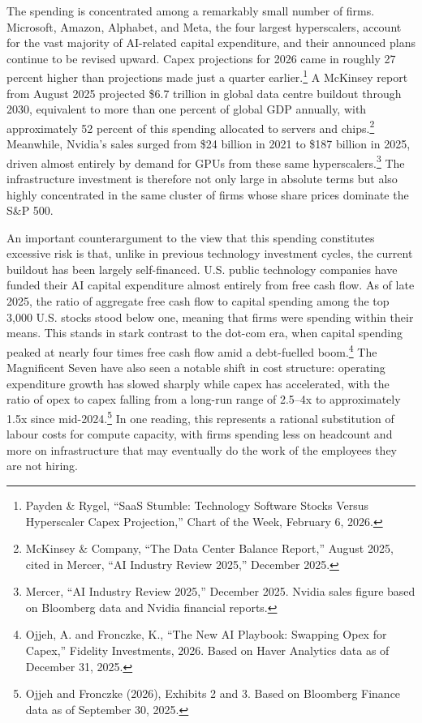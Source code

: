 \documentclass[12pt,a4paper]{article}
\begin{document}
The spending is concentrated among a remarkably small number of firms. Microsoft, Amazon, Alphabet, and Meta, the four largest hyperscalers, account for the vast majority of AI-related capital expenditure, and their announced plans continue to be revised upward. Capex projections for 2026 came in roughly 27 percent higher than projections made just a quarter earlier.\footnote{Payden \& Rygel, ``SaaS Stumble: Technology Software Stocks Versus Hyperscaler Capex Projection,'' Chart of the Week, February 6, 2026.} A McKinsey report from August 2025 projected \$6.7 trillion in global data centre buildout through 2030, equivalent to more than one percent of global GDP annually, with approximately 52 percent of this spending allocated to servers and chips.\footnote{McKinsey \& Company, ``The Data Center Balance Report,'' August 2025, cited in Mercer, ``AI Industry Review 2025,'' December 2025.} Meanwhile, Nvidia's sales surged from \$24 billion in 2021 to \$187 billion in 2025, driven almost entirely by demand for GPUs from these same hyperscalers.\footnote{Mercer, ``AI Industry Review 2025,'' December 2025. Nvidia sales figure based on Bloomberg data and Nvidia financial reports.} The infrastructure investment is therefore not only large in absolute terms but also highly concentrated in the same cluster of firms whose share prices dominate the S\&P 500.
 
An important counterargument to the view that this spending constitutes excessive risk is that, unlike in previous technology investment cycles, the current buildout has been largely self-financed. U.S. public technology companies have funded their AI capital expenditure almost entirely from free cash flow. As of late 2025, the ratio of aggregate free cash flow to capital spending among the top 3,000 U.S. stocks stood below one, meaning that firms were spending within their means. This stands in stark contrast to the dot-com era, when capital spending peaked at nearly four times free cash flow amid a debt-fuelled boom.\footnote{Ojjeh, A. and Fronczke, K., ``The New AI Playbook: Swapping Opex for Capex,'' Fidelity Investments, 2026. Based on Haver Analytics data as of December 31, 2025.} The Magnificent Seven have also seen a notable shift in cost structure: operating expenditure growth has slowed sharply while capex has accelerated, with the ratio of opex to capex falling from a long-run range of 2.5--4x to approximately 1.5x since mid-2024.\footnote{Ojjeh and Fronczke (2026), Exhibits 2 and 3. Based on Bloomberg Finance data as of September 30, 2025.} In one reading, this represents a rational substitution of labour costs for compute capacity, with firms spending less on headcount and more on infrastructure that may eventually do the work of the employees they are not hiring.
 
\end{document}
